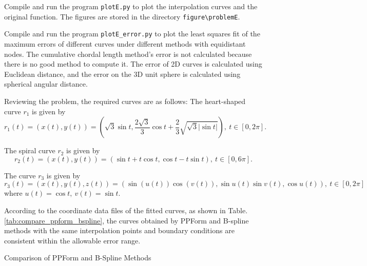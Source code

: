 \documentclass[a4paper]{article}
\begin{document}
\begin{sloppypar}
Compile and run the program \verb|plotE.py| to plot the interpolation curves
and the original function. The figures are stored in the directory
\verb|figure\problemE|.

Compile and run the program \verb|plotE_error.py| to plot the least squares fit
of the maximum errors of different curves under different methods with
equidistant nodes. The cumulative chordal length method's error is not
calculated because there is no good method to compute it. The error of 2D
curves is calculated using Euclidean distance, and the error on the 3D unit
sphere is calculated using spherical angular distance.

Reviewing the problem, the required curves are as follows: The heart-shaped
curve \(r_1\) is given by $$ r_1(t)=(x(t),y(t))=\left(\sqrt{3} \sin t, \frac{2
    \sqrt{3}}{3} \cos t + \frac{2}{3} \sqrt{\sqrt{3} |\sin t|}\right),\ t\in
  [0,2\pi]. $$

The spiral curve \(r_2\) is given by $$ r_2(t)=(x(t),y(t))=(\sin t+t\cos t,\cos
  t-t\sin t),\ t\in[0,6\pi]. $$

The curve \(r_3\) is given by $$
  r_3(t)=(x(t),y(t),z(t))=(\sin(u(t))\cos(v(t)),\sin u(t)\sin v(t),\cos u(t)),\
  t\in[0,2\pi] $$ where \(u(t)=\cos t,\:v(t)=\sin t\).

According to the coordinate data files of the fitted curves, as shown in
Table.\ref{tab:compare_ppform_bspline}, the curves obtained by PPForm and
B-spline methods with the same interpolation points and boundary conditions are
consistent within the allowable error range.

\begin{table}[H]
  \centering
  \renewcommand{\tablename}{Table.}
  \caption{Comparison of PPForm and B-Spline Methods}
  \label{tab:compare_ppform_bspline}
\end{table}


\end{sloppypar}
\end{document}
